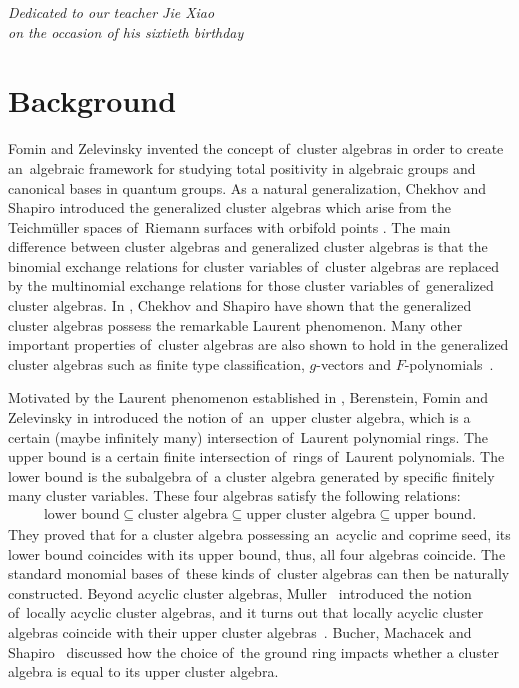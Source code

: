 \documentclass[pdftex]{sigma}
\numberwithin{equation}{section}
\begin{document}


\begin{flushright}
\begin{minipage}{65mm}
\it Dedicated to our teacher Jie Xiao\\ on the occasion of his sixtieth birthday
\end{minipage}
\end{flushright}

\renewcommand{\thefootnote}{\arabic{footnote}}
\setcounter{footnote}{0}

\section{Background}
Fomin and Zelevinsky invented the concept of~cluster algebras \cite{ca1,ca2} in order
to create an~algebraic framework for studying total positivity in algebraic groups and canonical bases in quantum groups. As a natural generalization,
Chekhov and Shapiro introduced the generalized cluster algebras which arise from the Teichm\"{u}ller spaces of~Riemann surfaces with orbifold points \cite{CS}.
The main difference between cluster algebras and generalized cluster algebras is that the binomial exchange relations for cluster
variables of~cluster algebras are replaced by the multinomial exchange relations for those cluster
variables of~generalized cluster algebras. In \cite{CS}, Chekhov and Shapiro have shown that the generalized cluster algebras possess the remarkable Laurent phenomenon. Many other important properties of~cluster algebras are also shown to hold in the generalized cluster algebras such as finite type classification, $g$-vectors and $F$-polynomials~\cite{CS, nak2}.


Motivated by the Laurent phenomenon established in \cite{ca1}, Berenstein, Fomin and Zelevinsky in \cite{bfz} introduced the notion of~an~upper cluster algebra, which is a certain (maybe infinitely many) intersection of~Laurent polynomial rings.
The upper bound is a certain finite intersection of~rings of~Laurent polynomials.
The lower bound is the subalgebra of~a cluster algebra generated by specific finitely many cluster variables.
These four algebras satisfy the following relations:
\begin{gather*}
 \text{lower bound}\subseteq \text{cluster algebra}\subseteq \text{upper cluster algebra}\subseteq \text{upper bound}.
\end{gather*}
They proved that for a cluster algebra possessing an~acyclic and coprime seed, its lower bound coincides with its upper bound, thus, all four algebras coincide. The standard monomial bases of~these kinds of~cluster algebras can then be naturally constructed.
Beyond acyclic cluster algebras, Muller~\cite{muller13} introduced the notion of~locally acyclic cluster algebras, and it turns out that locally acyclic cluster algebras coincide with their upper cluster algebras~\cite{muller13, muller14}. Bucher, Machacek and Shapiro~\cite{BMS} discussed how the choice of~the ground ring impacts whether a cluster algebra is equal to its upper cluster algebra.
\end{document}
